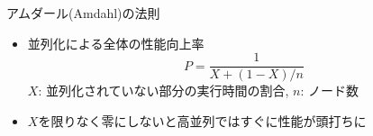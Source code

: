 \documentclass[dvipdfmx]{beamer}
\begin{document}
\begin{frame}[t,fragile]{アムダール(Amdahl)の法則}
  \begin{itemize}
    \setlength{\itemsep}{1em}
  \item 並列化による全体の性能向上率
    \[
    P = \frac{1}{X+(1-X)/n}
    \]
    $X$: 並列化されていない部分の実行時間の割合, $n$: ノード数
  \item $X$を限りなく零にしないと高並列ではすぐに性能が頭打ちに
  \end{itemize}
  \vspace*{-0em}\hspace*{1em}
\end{frame}
\end{document}
